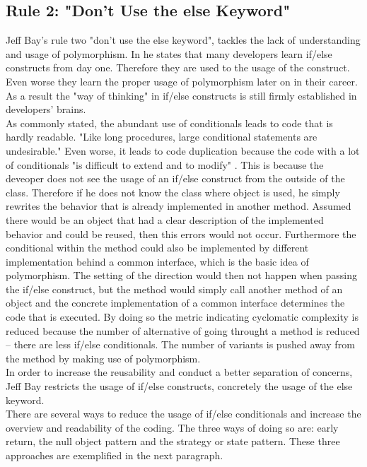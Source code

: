 \subsection*{Rule 2: "Don’t Use the else Keyword"}
\label{describe:rule2}
Jeff Bay's rule two "don’t use the else keyword", tackles the lack of understanding and usage of polymorphism. 
In \cite{oc2008} he states that many developers learn if/else constructs from day one. Therefore they are used to the usage of the construct. Even worse they learn the proper usage of polymorphism later on in their career. As a result the "way of thinking" in if/else constructs is still firmly established in developers' brains.
\\

As commonly stated, the abundant use of conditionals leads to code that is hardly readable\cite[p. 338]{gof}. "Like long procedures, large conditional statements are undesirable." \cite[p. 340]{gof} Even worse, it leads to code duplication because the code with a lot of conditionals "is difficult to extend and to modify" \cite{gof}. This is because the deveoper does not see the usage of an if/else construct from the outside of the class. Therefore if he does not know the class where object is used, he simply rewrites the behavior that is already implemented in another method. Assumed there would be an object that had a clear description of the implemented behavior and could be reused, then this errors would not occur. Furthermore the conditional within the method could also be implemented by different implementation behind a common interface, which is the basic idea of polymorphism. The setting of the direction would then not happen when passing the if/else construct, but the method would simply call another method of an object and the concrete implementation of a common interface determines the code that is executed. By doing so the metric indicating cyclomatic complexity is reduced because the number of alternative of going throught a method is reduced -- there are less if/else conditionals. The number of variants is pushed away from the method by making use of polymorphism.
\\

In order to increase the reusability and conduct a better separation of concerns, Jeff Bay restricts the usage of if/else constructs, concretely the usage of the else keyword.
\\

There are several ways to reduce the usage of if/else conditionals and increase the overview and readability of the coding. The three ways of doing so are: early return, the null object pattern and the strategy or state pattern. These three approaches are exemplified in the next paragraph. 

